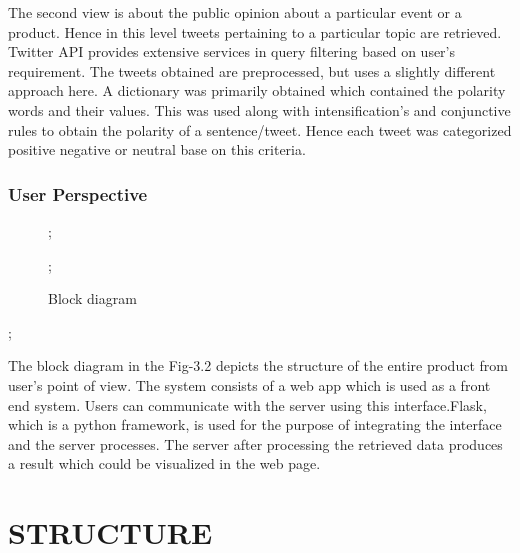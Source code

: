 The second view is about the public opinion about a particular event or a product. Hence in this level tweets pertaining to a particular topic are retrieved. Twitter API provides extensive services in query filtering based on user's requirement. The tweets obtained are preprocessed, but uses a slightly different approach here. A dictionary was primarily obtained which contained the polarity words and their values. This was used along with intensification's and conjunctive rules to obtain the polarity of a sentence/tweet. Hence each tweet was categorized positive negative or neutral base on this criteria.
\paragraph{}
\subsubsection{User Perspective}
\begin{figure}[!ht]
   
   
;
 \caption{Block diagram};
\end{figure};

The block diagram in the Fig-3.2 depicts the structure of the entire product from user's point of view.
The system consists of a web app which is used as a front end system. Users can communicate with the server using this interface.Flask, which is a python framework, is used for the purpose of integrating the interface and the server processes. The server after processing the retrieved data produces a result which could be visualized in the web page.

\section{STRUCTURE}
